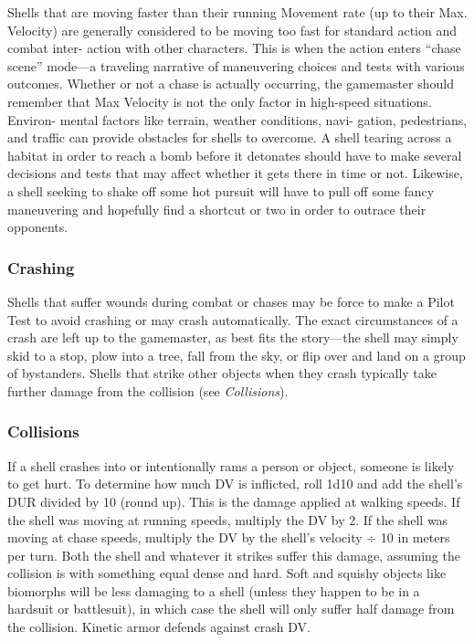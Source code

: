 Shells that are moving faster than their 
running Movement rate (up to their Max. 
Velocity) are generally considered to be 
moving too fast for standard action and combat inter-
action with other characters. This is when the action 
enters ``chase scene'' mode—a traveling narrative of 
maneuvering choices and tests with various outcomes. 
Whether or not a chase is actually occurring, the 
gamemaster should remember that Max Velocity is 
not the only factor in high-speed situations. Environ-
mental factors like terrain, weather conditions, navi-
gation, pedestrians, and traffic can provide obstacles 
for shells to overcome. A shell tearing across a habitat 
in order to reach a bomb before it detonates should 
have to make several decisions and tests that may 
affect whether it gets there in time or not. Likewise, a 
shell seeking to shake off some hot pursuit will have 
to pull off some fancy maneuvering and hopefully find 
a shortcut or two in order to outrace their opponents.

\subsubsection{Crashing}

Shells that suffer wounds during combat or chases 
may be force to make a Pilot Test to avoid crashing 
or may crash automatically. The exact circumstances 
of a crash are left up to the gamemaster, as best fits 
the story—the shell may simply skid to a stop, plow 
into a tree, fall from the sky, or flip over and land on 
a group of bystanders. Shells that strike other objects 
when they crash typically take further damage from 
the collision (see \textit{Collisions}).

\subsubsection{Collisions}

If a shell crashes into or intentionally rams a person or 
object, someone is likely to get hurt. To determine how 
much DV is inflicted, roll 1d10 and add the shell's DUR 
divided by 10 (round up). This is the damage applied 
at walking speeds. If the shell was moving at running 
speeds, multiply the DV by 2. If the shell was moving 
at chase speeds, multiply the DV by the shell's velocity 
÷ 10 in meters per turn. Both the shell and whatever 
it strikes suffer this damage, assuming the collision is 
with something equal dense and hard. Soft and squishy 
objects like biomorphs will be less damaging to a shell 
(unless they happen to be in a hardsuit or battlesuit), in 
which case the shell will only suffer half damage from 
the collision. Kinetic armor defends against crash DV.

